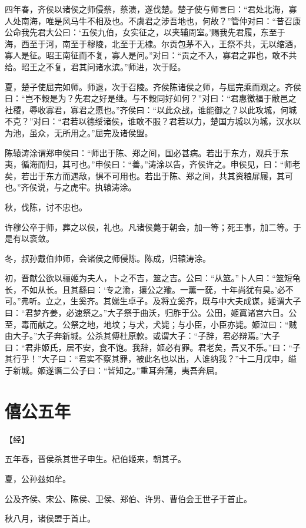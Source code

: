 \documentclass[a4paper,12pt,UTF8,twoside]{ctexbook}
\begin{document}
四年春，齐侯以诸侯之师侵蔡，蔡溃，遂伐楚。楚子使与师言曰：“君处北海，寡人处南海，唯是风马牛不相及也。不虞君之涉吾地也，何故？”管仲对曰：“昔召康公命我先君大公曰：‘五侯九伯，女实征之，以夹辅周室。’赐我先君履，东至于海，西至于河，南至于穆陵，北至于无棣。尔贡包茅不入，王祭不共，无以缩酒，寡人是征。昭王南征而不复，寡人是问。”对曰：“贡之不入，寡君之罪也，敢不共给。昭王之不复，君其问诸水滨。”师进，次于陉。

夏，楚子使屈完如师。师退，次于召陵。齐侯陈诸侯之师，与屈完乘而观之。齐侯曰：“岂不穀是为？先君之好是继。与不穀同好如何？”对曰：“君惠徼福于敝邑之社稷，辱收寡君，寡君之愿也。”齐侯曰：“以此众战，谁能御之？以此攻城，何城不克？”对曰：“君若以德绥诸侯，谁敢不服？君若以力，楚国方城以为城，汉水以为池，虽众，无所用之。”屈完及诸侯盟。

陈辕涛涂谓郑申侯曰：“师出于陈、郑之间，国必甚病。若出于东方，观兵于东夷，循海而归，其可也。”申侯曰：“善。”涛涂以告，齐侯许之。申侯见，曰：“师老矣，若出于东方而遇敌，惧不可用也。若出于陈、郑之间，共其资粮屝屦，其可也。”齐侯说，与之虎牢。执辕涛涂。

秋，伐陈，讨不忠也。

许穆公卒于师，葬之以侯，礼也。凡诸侯薨于朝会，加一等；死王事，加二等。于是有以衮敛。

冬，叔孙戴伯帅师，会诸侯之师侵陈。陈成，归辕涛涂。

初，晋献公欲以骊姬为夫人，卜之不吉，筮之吉。公曰：“从筮。”卜人曰：“筮短龟长，不如从长。且其繇曰：‘专之渝，攘公之羭。一薰一莸，十年尚犹有臭。’必不可。”弗听。立之，生奚齐。其娣生卓子。及将立奚齐，既与中大夫成谋，姬谓大子曰：“君梦齐姜，必速祭之。”大子祭于曲沃，归胙于公。公田，姬寘诸宫六日。公至，毒而献之。公祭之地，地坟；与犬，犬毙；与小臣，小臣亦毙。姬泣曰：“贼由大子。”大子奔新城。公杀其傅杜原款。或谓大子：“子辞，君必辩焉。”大子曰：“君非姬氏，居不安，食不饱。我辞，姬必有罪。君老矣，吾又不乐。”曰：“子其行乎！”大子曰：“君实不察其罪，被此名也以出，人谁纳我？”十二月戊申，缢于新城。姬遂谮二公子曰：“皆知之。”重耳奔蒲，夷吾奔屈。


\chapter{僖公五年}


【经】

五年春，晋侯杀其世子申生。杞伯姬来，朝其子。

夏，公孙兹如牟。

公及齐侯、宋公、陈侯、卫侯、郑伯、许男、曹伯会王世子于首止。

秋八月，诸侯盟于首止。
\end{document}
